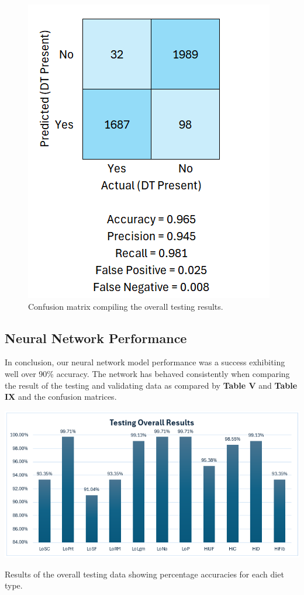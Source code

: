 \begin{figure}[H]
    \centering
    \includegraphics[width=\linewidth]{Figures/confusion_t.png}
    \caption{Confusion matrix compiling the overall testing results.}
\end{figure} 

\subsection{Neural Network Performance}
In conclusion, our neural network model performance was a success exhibiting well over 90\% accuracy. The network has behaved consistently when comparing the result of the testing and validating data as compared by \textbf{Table V} and \textbf{Table IX} and the confusion matrices.

\begin{table}[H]
    \centering
    \includegraphics[width=\linewidth]{Figures/bart.png}
    \caption{Results of the overall testing data showing percentage accuracies for each diet type.}
\end{table} 



